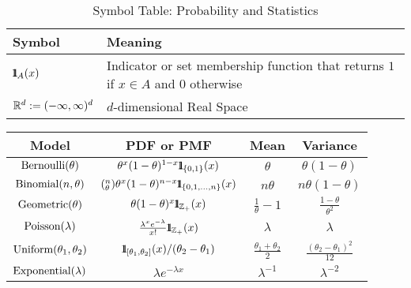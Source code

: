 {\begin{table}[htb]
\centering
{\small
\begin{tabular}{| l | l |}
\hline
Symbol & Meaning\\ \hline
${1}\mspace{-11 mu}{1}_{A}(x)$ & Indicator or set membership function that returns $1$ if $x \in A$ and $0$ otherwise\\
$\mathbb{R}^d := (-\infty,\infty)^d$ & $d$-dimensional Real Space \\
\hline
\end{tabular}
}
\caption{Symbol Table: Probability and Statistics \label{T:SymbTableProbStats}}
\end{table}

\begin{table}[ht]
\centering
\begin{tabular}{|c|c|c|c|}%
\hline
Model &PDF or PMF&Mean&Variance\\ \hline%
$\mbox{{\rm Bernoulli}}(\theta)$ &$\theta^x(1-\theta)^{1-x} {1}\mspace{-11 mu}{1}_{\{0,1\}}(x)$&$\theta$&$\theta(1-\theta)$\\%
$\mbox{{\rm Binomial}}(n,\theta)$&$(^n_{\theta})\theta^x(1-\theta)^{n-x} {1}\mspace{-11 mu}{1}_{\{0,1,\ldots,n\}}(x)$&$n \theta$&$n \theta(1-\theta)$\\%
$\mbox{{\rm Geometric}}(\theta)$ &$\theta(1-\theta)^{x} {1}\mspace{-11 mu}{1}_{\mathbb{Z}_+}(x)$&$ \frac{1}{\theta}-1$&$\frac{1-\theta}{\theta^2}$\\%
$\mbox{{\rm Poisson}}(\lambda)$&$\frac{\lambda^xe^{-\lambda}}{x!} {1}\mspace{-11 mu}{1}_{\mathbb{Z}_+}(x)$&$\lambda$&$\lambda$\\%
$\mbox{{\rm Uniform}}(\theta_1,\theta_2)$&${1}\mspace{-11 mu}{1}_{[\theta_1,\theta_2]}(x)/(\theta_2-\theta_1)$&$\frac{\theta_1+\theta_2}{2}$&$\frac{(\theta_2-\theta_1)^2}{12}$\\%
$\mbox{{\rm Exponential}}(\lambda)$&$\lambda e^{-\lambda x}$&$\lambda^{-1}$&$\lambda^{-2}$\\%

\end{tabular}
\end{table}}
